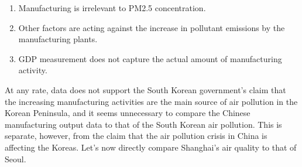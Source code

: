 \documentclass[11pt]{article}
\providecommand{\tightlist}{%
      \setlength{\itemsep}{0pt}\setlength{\parskip}{0pt}}
\begin{document}
\begin{enumerate}
\def\labelenumi{\arabic{enumi}.}
\tightlist
\item
  Manufacturing is irrelevant to PM2.5 concentration.
\item
  Other factors are acting against the increase in pollutant emissions
  by the manufacturing plants.
\item
  GDP measurement does not capture the actual amount of manufacturing
  activity.
\end{enumerate}

At any rate, data does not support the South Korean government's claim
that the increasing manufacturing activities are the main source of air
pollution in the Korean Peninsula, and it seems unnecessary to compare
the Chinese manufacturing output data to that of the South Korean air
pollution. This is separate, however, from the claim that the air
pollution crisis in China is affecting the Koreas. Let's now directly
compare Shanghai's air quality to that of Seoul.
\end{document}
